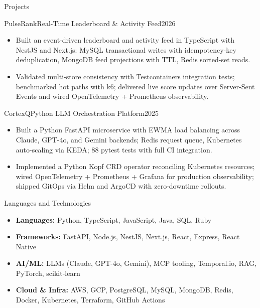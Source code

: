 \documentclass[]{mcdowellcv}
\begin{document}
\begin{cvsection}{Projects}
  \begin{cvsubsection}{PulseRank}{Real-Time Leaderboard \& Activity Feed}{2026}
    \begin{itemize}
      \item Built an event-driven leaderboard and activity feed in TypeScript with NestJS and Next.js: MySQL transactional writes with idempotency-key deduplication, MongoDB feed projections with TTL, Redis sorted-set reads.
      \item Validated multi-store consistency with Testcontainers integration tests; benchmarked hot paths with k6; delivered live score updates over Server-Sent Events and wired OpenTelemetry + Prometheus observability.
    \end{itemize}
    \vspace{-1.5pt}
  \end{cvsubsection}

  \begin{cvsubsection}{CortexQ}{Python LLM Orchestration Platform}{2025}
    \begin{itemize}
      \item Built a Python FastAPI microservice with EWMA load balancing across Claude, GPT-4o, and Gemini backends; Redis request queue, Kubernetes auto-scaling via KEDA; 88 pytest tests with full CI integration.
      \item Implemented a Python Kopf CRD operator reconciling Kubernetes resources; wired OpenTelemetry + Prometheus + Grafana for production observability; shipped GitOps via Helm and ArgoCD with zero-downtime rollouts.
    \end{itemize}
    \vspace{-1.5pt}
  \end{cvsubsection}
\end{cvsection}

\begin{cvsection}{Languages and Technologies}
  \begin{cvsubsection}{}{}{}
    \begin{itemize}
      \item \textbf{Languages:} Python, TypeScript, JavaScript, Java, SQL, Ruby
      \item \textbf{Frameworks:} FastAPI, Node.js, NestJS, Next.js, React, Express, React Native
      \item \textbf{AI/ML:} LLMs (Claude, GPT-4o, Gemini), MCP tooling, Temporal.io, RAG, PyTorch, scikit-learn
      \item \textbf{Cloud \& Infra:} AWS, GCP, PostgreSQL, MySQL, MongoDB, Redis, Docker, Kubernetes, Terraform, GitHub Actions
    \end{itemize}
  \end{cvsubsection}
\end{cvsection}
\end{document}
